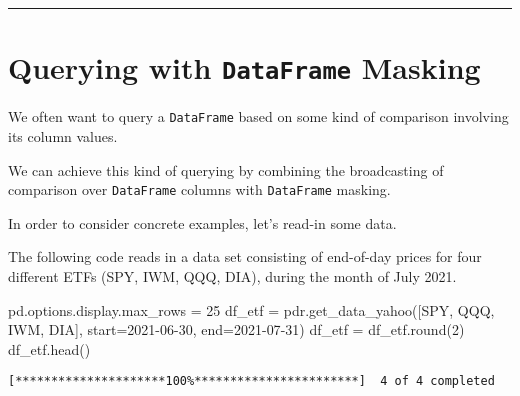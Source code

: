 \documentclass[
  letterpaper,
  DIV=11,
  numbers=noendperiod]{scrreprt}
\newenvironment{Shaded}{\begin{snugshade}}{\end{snugshade}}
\newcommand{\BuiltInTok}[1]{\textcolor[rgb]{0.00,0.23,0.31}{#1}}
\newcommand{\DecValTok}[1]{\textcolor[rgb]{0.68,0.00,0.00}{#1}}
\newcommand{\NormalTok}[1]{\textcolor[rgb]{0.00,0.23,0.31}{#1}}
\newcommand{\OperatorTok}[1]{\textcolor[rgb]{0.37,0.37,0.37}{#1}}
\newcommand{\StringTok}[1]{\textcolor[rgb]{0.13,0.47,0.30}{#1}}
\begin{document}
\begin{center}\rule{0.5\linewidth}{0.5pt}\end{center}

\hypertarget{querying-with-dataframe-masking}{%
\section{\texorpdfstring{Querying with \texttt{DataFrame}
Masking}{Querying with DataFrame Masking}}\label{querying-with-dataframe-masking}}

We often want to query a \texttt{DataFrame} based on some kind of
comparison involving its column values.

We can achieve this kind of querying by combining the broadcasting of
comparison over \texttt{DataFrame} columns with \texttt{DataFrame}
masking.

In order to consider concrete examples, let's read-in some data.

The following code reads in a data set consisting of end-of-day prices
for four different ETFs (SPY, IWM, QQQ, DIA), during the month of July
2021.

\begin{Shaded}
\begin{Highlighting}[]
\NormalTok{pd.options.display.max\_rows }\OperatorTok{=} \DecValTok{25}
\NormalTok{df\_etf }\OperatorTok{=}\NormalTok{ pdr.get\_data\_yahoo([}\StringTok{\textquotesingle{}SPY\textquotesingle{}}\NormalTok{, }\StringTok{\textquotesingle{}QQQ\textquotesingle{}}\NormalTok{, }\StringTok{\textquotesingle{}IWM\textquotesingle{}}\NormalTok{, }\StringTok{\textquotesingle{}DIA\textquotesingle{}}\NormalTok{], start}\OperatorTok{=}\StringTok{\textquotesingle{}2021{-}06{-}30\textquotesingle{}}\NormalTok{, end}\OperatorTok{=}\StringTok{\textquotesingle{}2021{-}07{-}31\textquotesingle{}}\NormalTok{)}
\NormalTok{df\_etf }\OperatorTok{=}\NormalTok{ df\_etf.}\BuiltInTok{round}\NormalTok{(}\DecValTok{2}\NormalTok{)}
\NormalTok{df\_etf.head()}
\end{Highlighting}
\end{Shaded}

\begin{verbatim}
[*********************100%***********************]  4 of 4 completed
\end{verbatim}
\end{document}
